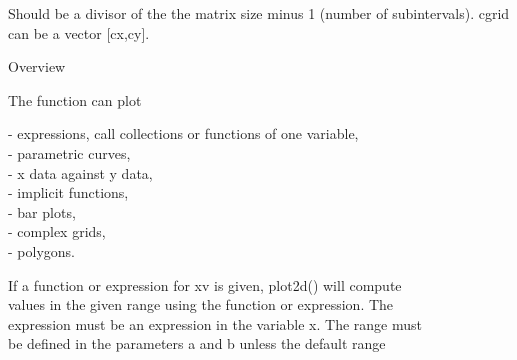 \documentclass[a4paper,10pt]{article}
\begin{document}
\begin{eulernotebook}
\begin{eulercomment}
\begin{eulercomment}
\begin{eulercomment}
\begin{eulercomment}
\begin{eulercomment}
\begin{eulercomment}
\begin{eulercomment}
\begin{eulercomment}
\begin{eulercomment}
\begin{eulercomment}
\begin{eulercomment}
\begin{eulercomment}
\begin{eulercomment}
\begin{eulercomment}
\begin{eulercomment}
\begin{eulercomment}
\begin{eulercomment}
\begin{eulercomment}
\begin{eulercomment}
\begin{eulercomment}
\begin{eulercomment}
\begin{eulercomment}
\begin{eulercomment}
\begin{eulercomment}
\begin{eulercomment}
\begin{eulercomment}
\begin{eulercomment}
\begin{eulercomment}
\begin{eulercomment}
\begin{eulercomment}
\begin{eulercomment}
\begin{eulercomment}
\begin{eulercomment}
\begin{eulercomment}
\begin{eulercomment}
\begin{eulercomment}
\begin{eulercomment}
\begin{eulercomment}
\begin{eulercomment}
\begin{eulercomment}
\begin{eulercomment}
\begin{eulercomment}
\begin{eulercomment}
\begin{eulercomment}
\begin{eulercomment}
\begin{eulercomment}
\begin{eulercomment}
\begin{eulercomment}
\begin{eulercomment}
\begin{eulercomment}
\begin{eulerttcomment}
  Should be a divisor of the the matrix size minus 1 (number of
  subintervals). cgrid can be a vector [cx,cy].
\end{eulerttcomment}
\begin{eulercomment}

Overview

The function can plot

- expressions, call collections or functions of one variable,\\
- parametric curves,\\
- x data against y data,\\
- implicit functions,\\
- bar plots,\\
- complex grids,\\
- polygons.

If a function or expression for xv is given, plot2d() will compute\\
values in the given range using the function or expression. The\\
expression must be an expression in the variable x. The range must\\
be defined in the parameters a and b unless the default range\\

\end{eulercomment}
\end{eulercomment}
\end{eulercomment}
\end{eulercomment}
\end{eulercomment}
\end{eulercomment}
\end{eulercomment}
\end{eulercomment}
\end{eulercomment}
\end{eulercomment}
\end{eulercomment}
\end{eulercomment}
\end{eulercomment}
\end{eulercomment}
\end{eulercomment}
\end{eulercomment}
\end{eulercomment}
\end{eulercomment}
\end{eulercomment}
\end{eulercomment}
\end{eulercomment}
\end{eulercomment}
\end{eulercomment}
\end{eulercomment}
\end{eulercomment}
\end{eulercomment}
\end{eulercomment}
\end{eulercomment}
\end{eulercomment}
\end{eulercomment}
\end{eulercomment}
\end{eulercomment}
\end{eulercomment}
\end{eulercomment}
\end{eulercomment}
\end{eulercomment}
\end{eulercomment}
\end{eulercomment}
\end{eulercomment}
\end{eulercomment}
\end{eulercomment}
\end{eulercomment}
\end{eulercomment}
\end{eulercomment}
\end{eulercomment}
\end{eulercomment}
\end{eulercomment}
\end{eulercomment}
\end{eulercomment}
\end{eulercomment}
\end{eulercomment}
\end{eulernotebook}
\end{document}
